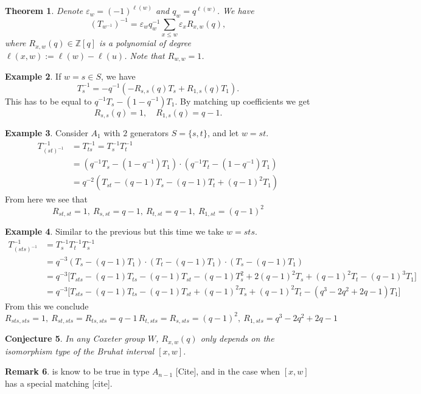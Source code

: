 \documentclass[12pt]{amsart}
\numberwithin{equation}{section}
\theoremstyle{plain}
\newtheorem{theorem}{Theorem}[section]
\newtheorem{conj}[theorem]{Conjecture}
\theoremstyle{definition}
\newtheorem{remark}[theorem]{Remark}
\newtheorem{example}[theorem]{Example}
\begin{document}
\begin{theorem}\label{thm:def_R_poly}
Denote $\varepsilon_w =(-1)^{\ell(w)}$ and $q_w=q^{\ell(w)}$. We have
\[\left(T_{w^{-1}}\right)^{-1}=\varepsilon_w q_w^{-1}\sum_{x\leq w}\varepsilon_x R_{x,w}(q),\]
where $R_{x,w}(q)\in\mathbb{Z}[q]$ is a polynomial of degree $\ell(x,w):=\ell(w)-\ell(u)$. Note that $R_{w,w}=1$.
\end{theorem}
\begin{example}If $w=s\in S$, we have
	\[T_{s}^{-1}=-q^{-1}\left( -R_{s,s}(q)T_s+R_{1,s}(q)T_1\right).\]
	This has to be equal to $q^{-1}T_s-(1-q^{-1})T_1$. By matching up coefficients we get
	\[R_{s,s}(q)=1,\quad R_{1,s}(q)=q-1.\]
\end{example}
\begin{example}
	Consider $A_1$ with $2$ generators $S=\{s,t\}$, and let $w=st$.
	\begin{align*}
		T_{(st)^{-1}}^{-1}&=T_{ts}^{-1}=T_s^{-1}T_t^{-1}\\&=\left(q^{-1}T_s-(1-q^{-1})T_1\right)\cdot\left(q^{-1}T_t-(1-q^{-1})T_1\right)\\
		&=q^{-2}\left(T_{st}-(q-1)T_s-(q-1)T_t+(q-1)^2T_1\right)
	\end{align*}
	From here we see that
	\[R_{st,st}=1,\ R_{s,st}=q-1,\ R_{t,st}=q-1,\ R_{1,st}=(q-1)^2\]
\end{example}
\begin{example}
	Similar to the previous but this time we take $w=sts$.
	\begin{align*}
		T_{(sts)^{-1}}^{-1}&=T_s^{-1}T_t^{-1}T_s^{-1}\\
		&=q^{-3}(T_s-(q-1)T_1)\cdot(T_t-(q-1)T_1)\cdot(T_s-(q-1)T_1)\\
		&=q^{-3}\big[T_{sts}-(q-1)T_{ts}-(q-1)T_{st}-(q-1)T_s^2+2(q-1)^2T_s+(q-1)^2T_t-(q-1)^3T_1\big]\\
		&=q^{-3}\big[T_{sts}-(q-1)T_{ts}-(q-1)T_{st}+(q-1)^2 T_s+(q-1)^2T_t-(q^3-2q^2+2q-1)T_1\big]
	\end{align*}
	From this we conclude
	\[R_{sts,sts}=1,\ R_{st,sts}=R_{ts,sts}=q-1\, R_{t,sts}=R_{s,sts}=(q-1)^2,\ R_{1,sts}=q^3-2q^2+2q-1\]
\end{example}
\begin{conj}\label{conj:comb_inv}
	In any Coxeter group $W$, $R_{x,w}(q)$ only depends on the isomorphism type of the Bruhat interval $[x,w]$.
\end{conj}
\begin{remark}
	 is know to be true in type $A_{n-1}$ [Cite], and in the case when $[x,w]$ has a special matching [cite].
\end{remark}
\end{document}
